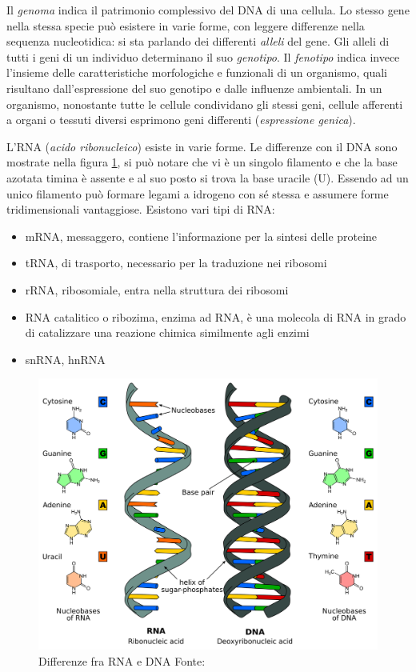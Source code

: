 Il \textit{genoma} indica il patrimonio complessivo del DNA di una cellula. Lo stesso gene nella stessa specie può esistere in varie forme, con leggere differenze nella sequenza nucleotidica: si sta parlando dei differenti \textit{alleli} del gene.
Gli alleli di tutti i geni di un individuo determinano il suo \textit{genotipo}.  Il \textit{fenotipo} indica invece l'insieme delle caratteristiche morfologiche e funzionali di un organismo, quali risultano dall'espressione del suo genotipo e dalle influenze ambientali. In un organismo, nonostante tutte le cellule condividano gli stessi geni, cellule afferenti a organi o tessuti diversi esprimono geni differenti (\textit{espressione genica}).
\\

\par L'RNA (\textit{acido ribonucleico}) esiste in varie forme. Le differenze con il DNA sono mostrate nella figura \ref{fig:rna-dna-differenze}, si può notare che vi è un singolo filamento e che la base azotata timina è assente e al suo posto si trova la base uracile (U). Essendo ad un unico filamento può formare legami a idrogeno con sé stessa e assumere forme tridimensionali vantaggiose. Esistono vari tipi di RNA: 

\begin{itemize}
	\item mRNA, messaggero, contiene l'informazione per la sintesi delle proteine
	\item tRNA, di trasporto, necessario per la traduzione nei ribosomi
	\item rRNA, ribosomiale, entra nella struttura dei ribosomi
	\item RNA catalitico o ribozima, enzima ad RNA, è una molecola di RNA in grado di catalizzare una reazione chimica similmente agli enzimi
	\item snRNA, hnRNA
\end{itemize}

\begin{figure}[h]
	\centering
	\includegraphics[scale=0.15]{images/dna-rna.png}
	\caption{Differenze fra RNA e DNA Fonte: \cite{dna-rna-image}}
	\label{fig:rna-dna-differenze}
\end{figure}

